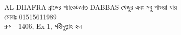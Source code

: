 \documentclass{article}
\begin{document}
\centering
{}
{{\fontsize{71}{85.2} \selectfont {} AL DHAFRA  ব্রান্ডের প্যাকেটজাত  DABBAS  খেজুর এবং মধু পাওয়া যায়\\}{\fontsize{52}{62.4}\selectfont মোবাঃ 01515611989\\  রুম - 1406, Ex-1, শহীদুল্লাহ হল\\}\vspace{1.4cm}}
\end{document}
